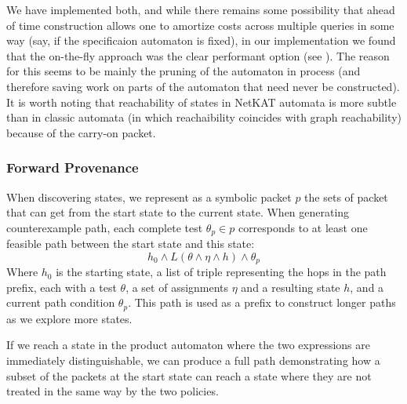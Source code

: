 \documentclass[acmsmall,dvipsnames,nonacm]{acmart}
\newcommand\NetKAT{\textsf{NetKAT}\xspace}
\begin{document}
We have implemented both, and while there remains some possibility
that ahead of time construction allows one to amortize costs across
multiple queries in some way (say, if the specificaion automaton is
fixed), in our implementation we found that the on-the-fly approach
was the clear performant option (see ). The reason for
this seems to be mainly the pruning of the automaton in process (and
therefore saving work on parts of the automaton that need never be
constructed). It is worth noting that reachability of states in
\NetKAT automata is more subtle than in classic automata (in which
reachaibility coincides with graph reachability) because of the
carry-on packet.

\subsubsection{Forward Provenance}

When discovering states, we represent as a symbolic packet $p$ the
sets of packet that can get from the start state to the current
state. When generating counterexample path, each complete test
$\theta_{p} \in p$ corresponds to at least one feasible path between
the start state and this state:
\[
\mathit{h}_{0} \wedge \mathit{L} (\theta \wedge \eta \wedge \mathit{h}) \wedge \theta_{p}
\]
Where $\mathit{h}_{0}$ is the starting state, a list of triple
representing the hops in the path prefix, each with a test $\theta$, a
set of assignments $\eta$ and a resulting state $\mathit{h}$, and a
current path condition $\theta_{p}$.  This path is used as a prefix to
construct longer paths as we explore more states.
\begin{comment}
For example, if $\mathit{h}$ transitions to $\mathit{h'}$ on test $\theta'$ with assignments $\eta'$ and $\theta_{p} \cap \theta' = \theta'_{p} \not= \emptyset$, and the result of performing assignments $\eta'$ on packets in $\theta'_{p}$ results in packets matching $\theta_{c}$, we can construct a new path from $\mathit{h}_{0}$ to $\mathit{h'}$:
\[
\mathit{h}_{0} \wedge \mathit{L} (\theta \wedge \eta \wedge \mathit{h}) \cdot (\theta' \wedge \eta' \wedge \mathit{h'}) \wedge \theta_{c}
\]
\end{comment}
If we reach a state in the product automaton where the two expressions
are immediately distinguishable, we can produce a full path
demonstrating how a subset of the packets at the start state can reach
a state where they are not treated in the same way by the two
policies.
\end{document}
